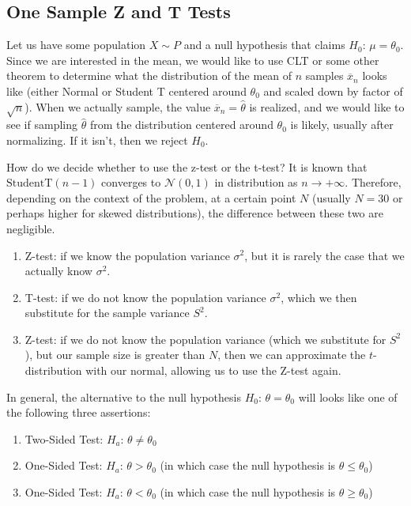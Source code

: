 \documentclass{article}
\begin{document}
  \subsection{One Sample Z and T Tests}

    Let us have some population $X \sim P$ and a null hypothesis that claims $H_0 : \, \mu = \theta_0$. Since we are interested in the mean, we would like to use CLT or some other theorem to determine what the distribution of the mean of $n$ samples $\overline{x}_n$ looks like (either Normal or Student T centered around $\theta_0$ and scaled down by factor of $\sqrt{n}$). When we actually sample, the value $\overline{x}_n = \hat{\theta}$ is realized, and we would like to see if sampling $\hat{\theta}$ from the distribution centered around $\theta_0$ is likely, usually after normalizing. If it isn't, then we reject $H_0$. 

    How do we decide whether to use the z-test or the t-test? It is known that $\mathrm{StudentT}(n-1)$ converges to $\mathcal{N}(0, 1)$ in distribution as $n \rightarrow +\infty$. Therefore, depending on the context of the problem, at a certain point $N$ (usually $N = 30$ or perhaps higher for skewed distributions), the difference between these two are negligible. 
    \begin{enumerate}
      \item Z-test: if we know the population variance $\sigma^2$, but it is rarely the case that we actually know $\sigma^2$. 
      \item T-test: if we do not know the population variance $\sigma^2$, which we then substitute for the sample variance $S^2$. 
      \item Z-test: if we do not know the population variance (which we substitute for $S^2$), but our sample size is greater than $N$, then we can approximate the $t$-distribution with our normal, allowing us to use the Z-test again. 
    \end{enumerate}

    In general, the alternative to the null hypothesis $H_0 : \, \theta = \theta_0$ will looks like one of the following three assertions: 
    \begin{enumerate}
      \item Two-Sided Test: $H_a : \, \theta \neq \theta_0$ 
      \item One-Sided Test: $H_a : \, \theta > \theta_0$ (in which case the null hypothesis is $\theta \leq \theta_0$) 
      \item One-Sided Test: $H_a : \, \theta < \theta_0$ (in which case the null hypothesis is $\theta \geq \theta_0$) 
    \end{enumerate}
\end{document}
